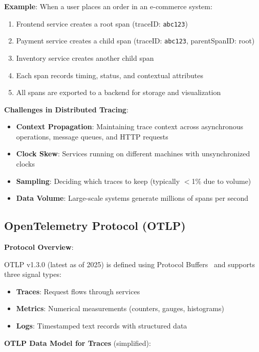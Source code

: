 \textbf{Example}: When a user places an order in an e-commerce system:

\begin{enumerate}
\item Frontend service creates a root span (traceID: \texttt{abc123})
\item Payment service creates a child span (traceID: \texttt{abc123}, parentSpanID: root)
\item Inventory service creates another child span
\item Each span records timing, status, and contextual attributes
\item All spans are exported to a backend for storage and visualization
\end{enumerate}

\textbf{Challenges in Distributed Tracing}:

\begin{itemize}
\item \textbf{Context Propagation}: Maintaining trace context across asynchronous operations, message queues, and HTTP requests
\item \textbf{Clock Skew}: Services running on different machines with unsynchronized clocks
\item \textbf{Sampling}: Deciding which traces to keep (typically $<$1\% due to volume)
\item \textbf{Data Volume}: Large-scale systems generate millions of spans per second
\end{itemize}

\subsection{OpenTelemetry Protocol (OTLP)}
\label{sec:otlp}

\textbf{Protocol Overview}:

OTLP v1.3.0 (latest as of 2025) is defined using Protocol Buffers~\cite{protobuf} and supports three signal types:

\begin{itemize}
\item \textbf{Traces}: Request flows through services
\item \textbf{Metrics}: Numerical measurements (counters, gauges, histograms)
\item \textbf{Logs}: Timestamped text records with structured data
\end{itemize}

\textbf{OTLP Data Model for Traces} (simplified):

